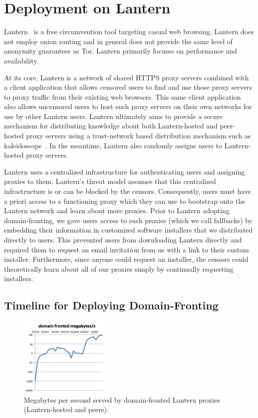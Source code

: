 \documentclass{sig-alternate}
\begin{document}
\section{Deployment on Lantern}
\label{sec:deploy-lantern}

Lantern~\cite{lantern} is a free circumvention tool targeting casual web browsing.
Lantern does not employ onion routing and in general does not provide the
same level of anonymity guarantees as Tor.  Lantern primarily focuses on
performance and availability.

At its core, Lantern is a network of shared HTTPS proxy servers combined
with a client application that allows censored users to find and use those
proxy servers to proxy traffic from their existing web browsers.  This same
client application also allows uncensored users to host such proxy servers
on their own networks for use by other Lantern users. Lantern ultimately
aims to provide a secure mechanism for distributing knowledge about both
Lantern-hosted and peer-hosted proxy servers using a trust-network based
distribution mechanism such as kaleidoscope~\cite{kaleidoscope}.  In the meantime, Lantern
also randomly assigns users to Lantern-hosted proxy servers.

Lantern uses a centralized infrastructure for authenticating users and
assigning proxies to them.  Lantern's threat model assumes that this
centralized infrastructure is or can be blocked by the censors.
Consequently, users must have a priori access to a functioning proxy which
they can use to bootstrap onto the Lantern network and learn about more
proxies. Prior to Lantern adopting domain-fronting, we gave users access to
such proxies (which we call fallbacks) by embedding their information in
customized software installers that we distributed directly to users.  This
prevented users from downloading Lantern directly and required them to
request an email invitation from us with a link to their custom installer.
Furthermore, since anyone could request an installer, the censors could
theoretically learn about all of our proxies simply by continually
requesting installers.

\subsection{Timeline for Deploying Domain-Fronting}

\begin{figure}
\centering
\includegraphics[height=1.5in]{clients-lantern}
\caption{
Megabytes per second served by domain-fronted Lantern proxies
(Lantern-hosted and peers).
}
\label{fig:lantern-bandwidth}
\end{figure}
\end{document}
